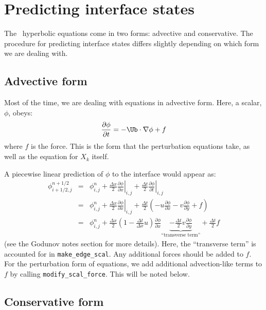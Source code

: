\label{ch:pert}

\section{Predicting interface states}

The \maestro\ hyperbolic equations come in two forms: advective and
conservative.  The procedure for predicting interface states differs
slightly depending on which form we are dealing with.

\subsection{Advective form}

Most of the time, we are dealing with equations in advective form.
Here, a scalar, $\phi$, obeys:
\begin{equation}
\frac{\partial \phi}{\partial t} = -\Ub \cdot \nabla \phi + f
\end{equation}
where $f$ is the force.  This is the form that the perturbation
equations take, as well as the equation for $X_k$ itself.

A piecewise linear prediction of $\phi$ to the interface 
would appear as:
\begin{eqnarray}
\phi_{i+1/2,j}^{n+1/2} &=& \phi_{i,j}^n 
    + \left . \frac{\Delta x}{2} \frac{\partial \phi}{\partial x} \right |_{i,j}
    + \left . \frac{\Delta t}{2} \frac{\partial \phi}{\partial t} \right |_{i,j} \\
 &=& \phi_{i,j}^n 
    + \left . \frac{\Delta x}{2} \frac{\partial \phi}{\partial x} \right |_{i,j}
    +  \frac{\Delta t}{2} \left ( -u \frac{\partial \phi}{\partial x} 
                                         -v \frac{\partial \phi}{\partial y} + f \right ) \\
 &=& \phi_{i,j}^n + \frac{\Delta x}{2} \left ( 1 - \frac{\Delta t}{\Delta x} u \right ) 
           \frac{\partial \phi}{\partial x} 
    \underbrace{- \frac{\Delta t}{2} v \frac{\partial \phi}{\partial y}}_{\text{``transverse~term''}} + \frac{\Delta t}{2} f
\end{eqnarray}
(see the Godunov notes section for more details).  Here, the
``transverse term'' is accounted for in {\tt make\_edge\_scal}.  Any
additional forces should be added to $f$.  For the perturbation form
of equations, we add additional advection-like terms to $f$ by calling
{\tt modify\_scal\_force}.  This will be noted below.

\subsection{Conservative form}

